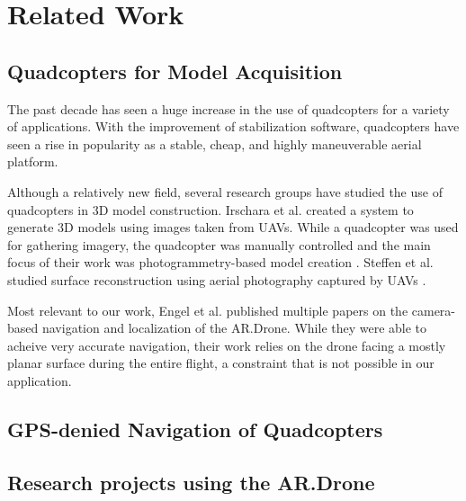 
\chapter{Related Work\label{ch:pastwork}}

\section{Quadcopters for Model Acquisition}

The past decade has seen a huge increase in the use of quadcopters for a variety of applications. With the improvement of stabilization software, quadcopters have seen a rise in popularity as a stable, cheap, and highly maneuverable aerial platform. 

Although a relatively new field, several research groups have studied the use of quadcopters in 3D model construction. Irschara et al. created a system to generate 3D models using images taken from UAVs. While a quadcopter was used for gathering imagery, the quadcopter was manually controlled and the main focus of their work was photogrammetry-based model creation \cite{Irschara}. Steffen et al. studied surface reconstruction using aerial photography captured by UAVs \cite{Steffen}.

Most relevant to our work, Engel et al. published multiple papers on the camera-based navigation and localization of the AR.Drone. While they were able to acheive very accurate navigation, their work relies on the drone facing a mostly planar surface during the entire flight, a constraint that is not possible in our application.

\section{GPS-denied Navigation of Quadcopters}

\section{Research projects using the AR.Drone}

